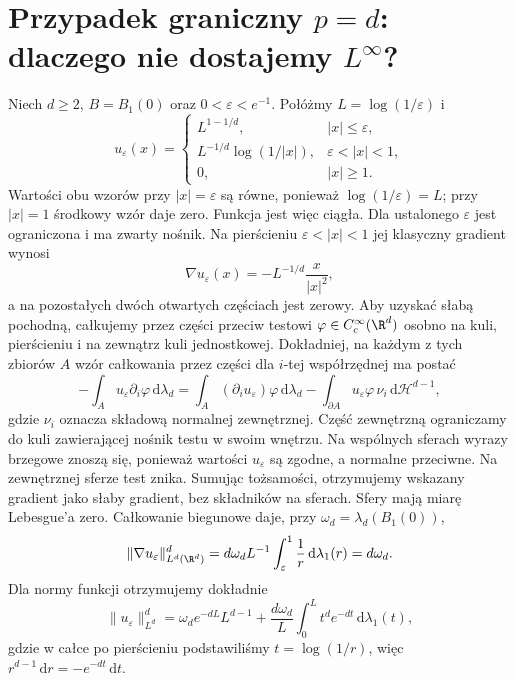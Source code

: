 \section[Przypadek graniczny w zanurzeniach Sobolewa]{Przypadek graniczny $p=d$: dlaczego nie dostajemy $L^\infty$?}
\label{sec:pde10-Moser}

\begin{kontrprzyklad}
\label{ex:pde10-Moser}
Niech $d\ge2$, $B=B_1(0)$ oraz $0<\varepsilon<e^{-1}$.
Połóżmy $L=\log(1/\varepsilon)$ i
\[
 u_\varepsilon(x)=
 \begin{cases}
 L^{1-1/d}, & |x|\le\varepsilon,\\
 L^{-1/d}\log(1/|x|), & \varepsilon<|x|<1,\\
 0,&|x|\ge1.
 \end{cases}
\]
Wartości obu wzorów przy $|x|=\varepsilon$ są równe,
ponieważ $\log(1/\varepsilon)=L$; przy $|x|=1$
środkowy wzór daje zero. Funkcja jest więc ciągła.
Dla ustalonego $\varepsilon$ jest ograniczona i ma
zwarty nośnik. Na pierścieniu $\varepsilon<|x|<1$
jej klasyczny gradient wynosi
\[
 \nabla u_\varepsilon(x)=-L^{-1/d}\frac{x}{|x|^2},
\]
a na pozostałych dwóch otwartych częściach jest zerowy.
Aby uzyskać słabą pochodną, całkujemy przez części
przeciw testowi $\varphi\in C_c^\infty(\R^d)$ osobno
na kuli, pierścieniu i na zewnątrz kuli jednostkowej.
Dokładniej, na każdym z tych zbiorów $A$ wzór
całkowania przez części dla $i$-tej współrzędnej ma postać
\[
 -\int_A u_\varepsilon\partial_i\varphi\,\mathrm d\lambda_d
 =\int_A(\partial_i u_\varepsilon)\varphi\,\mathrm d\lambda_d
 -\int_{\partial A}u_\varepsilon\varphi\,\nu_i\,
                         \mathrm d\mathcal H^{d-1},
\]
gdzie $\nu_i$ oznacza składową normalnej zewnętrznej.
Część zewnętrzną ograniczamy do kuli zawierającej
nośnik testu w swoim wnętrzu. Na wspólnych sferach
wyrazy brzegowe znoszą się, ponieważ wartości
$u_\varepsilon$ są zgodne, a normalne przeciwne.
Na zewnętrznej sferze test znika.
Sumując tożsamości, otrzymujemy wskazany gradient
jako słaby gradient, bez składników na sferach.
Sfery mają miarę Lebesgue'a zero. Całkowanie biegunowe
daje, przy $\omega_d=\lambda_d(B_1(0))$,
\[
 \|\nabla u_\varepsilon\|_{L^d(\R^d)}^d
 =d\omega_d L^{-1}\int_\varepsilon^1
             \frac{1}{r}\,\mathrm d\lambda_1(r)
 =d\omega_d.
\]
Dla normy funkcji otrzymujemy dokładnie
\[
 \|u_\varepsilon\|_{L^d}^d
 =\omega_d e^{-dL}L^{d-1}
  +\frac{d\omega_d}{L}\int_0^L t^d e^{-dt}
                      \,\mathrm d\lambda_1(t),
\]
gdzie w całce po pierścieniu podstawiliśmy
$t=\log(1/r)$, więc $r^{d-1}\,\mathrm dr=-e^{-dt}\,\mathrm dt$.

\end{kontrprzyklad}
